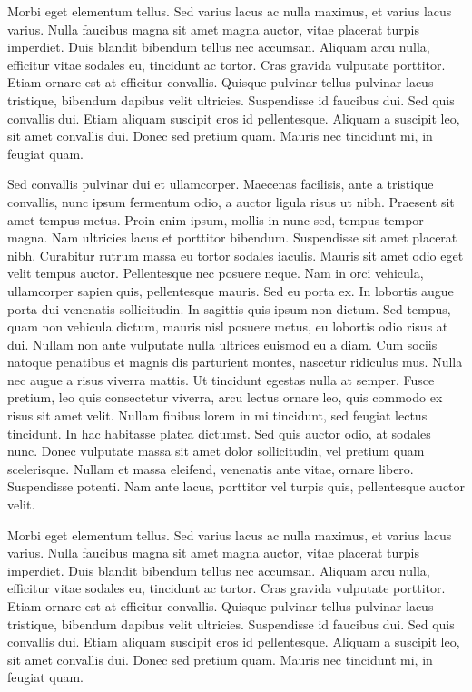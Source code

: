 Morbi eget elementum tellus. Sed varius lacus ac nulla maximus, et varius lacus varius. Nulla faucibus magna sit amet magna auctor, vitae placerat turpis imperdiet. Duis blandit bibendum tellus nec accumsan. Aliquam arcu nulla, efficitur vitae sodales eu, tincidunt ac tortor. Cras gravida vulputate porttitor. Etiam ornare est at efficitur convallis. Quisque pulvinar tellus pulvinar lacus tristique, bibendum dapibus velit ultricies. Suspendisse id faucibus dui. Sed quis convallis dui. Etiam aliquam suscipit eros id pellentesque. Aliquam a suscipit leo, sit amet convallis dui. Donec sed pretium quam. Mauris nec tincidunt mi, in feugiat quam.

Sed convallis pulvinar dui et ullamcorper. Maecenas facilisis, ante a tristique convallis, nunc ipsum fermentum odio, a auctor ligula risus ut nibh. Praesent sit amet tempus metus. Proin enim ipsum, mollis in nunc sed, tempus tempor magna. Nam ultricies lacus et porttitor bibendum. Suspendisse sit amet placerat nibh. Curabitur rutrum massa eu tortor sodales iaculis. Mauris sit amet odio eget velit tempus auctor. Pellentesque nec posuere neque. Nam in orci vehicula, ullamcorper sapien quis, pellentesque mauris. Sed eu porta ex. 
In lobortis augue porta dui venenatis sollicitudin. In sagittis quis ipsum non dictum. Sed tempus, quam non vehicula dictum, mauris nisl posuere metus, eu lobortis odio risus at dui. Nullam non ante vulputate nulla ultrices euismod eu a diam. Cum sociis natoque penatibus et magnis dis parturient montes, nascetur ridiculus mus. Nulla nec augue a risus viverra mattis. Ut tincidunt egestas nulla at semper. Fusce pretium, leo quis consectetur viverra, arcu lectus ornare leo, quis commodo ex risus sit amet velit. Nullam finibus lorem in mi tincidunt, sed feugiat lectus tincidunt. In hac habitasse platea dictumst. Sed quis auctor odio, at sodales nunc. Donec vulputate massa sit amet dolor sollicitudin, vel pretium quam scelerisque. Nullam et massa eleifend, venenatis ante vitae, ornare libero. Suspendisse potenti. Nam ante lacus, porttitor vel turpis quis, pellentesque auctor velit.

Morbi eget elementum tellus. Sed varius lacus ac nulla maximus, et varius lacus varius. Nulla faucibus magna sit amet magna auctor, vitae placerat turpis imperdiet. Duis blandit bibendum tellus nec accumsan. Aliquam arcu nulla, efficitur vitae sodales eu, tincidunt ac tortor. Cras gravida vulputate porttitor. Etiam ornare est at efficitur convallis. Quisque pulvinar tellus pulvinar lacus tristique, bibendum dapibus velit ultricies. Suspendisse id faucibus dui. Sed quis convallis dui. Etiam aliquam suscipit eros id pellentesque. Aliquam a suscipit leo, sit amet convallis dui. Donec sed pretium quam. Mauris nec tincidunt mi, in feugiat quam.

